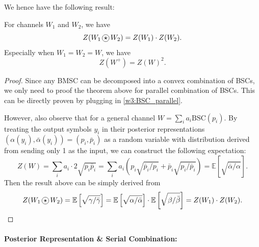 We hence have the following result:
\begin{theorem}
    For channels $W_1$ and $W_2$, we have
    \begin{equation}
        Z(W_1\ostar W_2) = Z(W_1)\cdot Z(W_2).
    \end{equation}
    Especially when $W_1=W_2=W$, we have
    \begin{equation}
        Z(W^+) = Z(W)^2.
    \end{equation}
\end{theorem}
\begin{proof}
    Since any BMSC can be decomposed into a convex combination of BSCs, we only need to proof the theorem above for parallel combination of BSCs. This can be directly proven by plugging in \autoref{w3:BSC_parallel}. 
    
    However, also observe that for a general channel $W=\sum_i a_i \mathrm{BSC}(p_i)$. By treating the output symbols $y_i$ in their posterior representations $(\alpha(y_i),\bar{\alpha}(y_i)) = (p_i,\bar{p}_i)$ as a random variable with distribution derived from sending only 1 as the input, we can construct the following expectation:
    \begin{equation*}
        Z(W) = \sum_i a_i\cdot2\sqrt{p_i\bar{p}_i} = \sum_i a_i\left(p_i\sqrt{\bar{p}_i/p_i} + \bar{p}_i \sqrt{p_i/\bar{p}_i}\right) = \mathbb{E}\left[\sqrt{\bar{\alpha}/\alpha}\right].
    \end{equation*}
    Then the result above can be simply derived from
    \begin{equation*}
        Z(W_1\ostar W_2) = \mathbb{E}\left[\sqrt{\gamma/\bar{\gamma}}\right] = \mathbb{E}\left[\sqrt{\alpha/\bar{\alpha}}\right] \cdot \mathbb{E}\left[\sqrt{\beta/\bar{\beta}}\right] = Z(W_1) \cdot Z(W_2).
    \end{equation*}
\end{proof}


\paragraph{Posterior Representation \& Serial Combination:}

